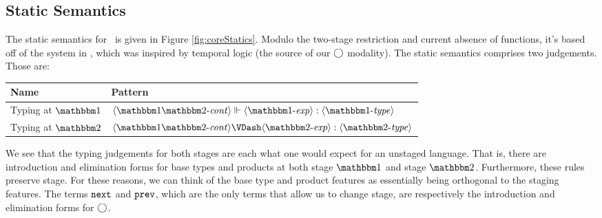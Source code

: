 \documentclass{article}
\begin{document}
\subsection{Static Semantics}

The static semantics for \corelang~is given in Figure \ref{fig:coreStatics}.  Modulo the two-stage restriction and current absence of functions, it's based off of the system in \cite{davies96}, which was inspired by temporal logic (the source of our $\bigcirc$ modality).  The static semantics comprises two judgements.  Those are:

\begin{center}
\begin{tabular}{|l|l|} \hline
Name & Pattern \\ \hline
Typing at $\bbone$ & $\typesone[\contextot]{\expro}{\typeo}$ \\  \hline
Typing at $\bbtwo$ & $\typestwo[\contextot]{\exprt}{\typet}$ \\ \hline
\end{tabular}
\end{center}

We see that the typing judgements for both stages are each what one would expect for an unstaged language.  That is, there are introduction and elimination forms for base types and products at both stage $\bbone$ and stage $\bbtwo$.  Furthermore, these rules preserve stage.  For these reasons, we can think of the base type and product features as essentially being orthogonal to the staging features.  The terms ${\tt next}$ and ${\tt prev}$, which are the only terms that allow us to change stage, are respectively the introduction and elimination forms for $\bigcirc$.
\end{document}
